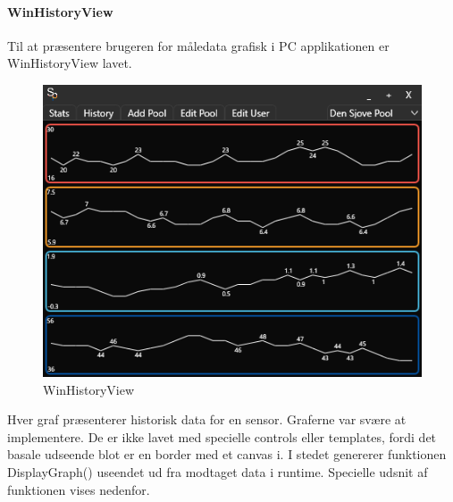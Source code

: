 \paragraph{WinHistoryView}
Til at præsentere brugeren for måledata grafisk i PC applikationen er WinHistoryView lavet.
\begin{figure}
\centering
\includegraphics[width=0.6\linewidth]{figs/implementering/winhistoryview}
\caption{WinHistoryView}
\label{fig:winhistoryview}
\end{figure}
Hver graf præsenterer historisk data for en sensor.
Graferne var svære at implementere. De er ikke lavet med specielle controls eller templates, fordi det basale udseende blot er en border med et canvas i. I stedet genererer funktionen DisplayGraph() useendet ud fra modtaget data i runtime. Specielle udsnit af funktionen vises nedenfor.

